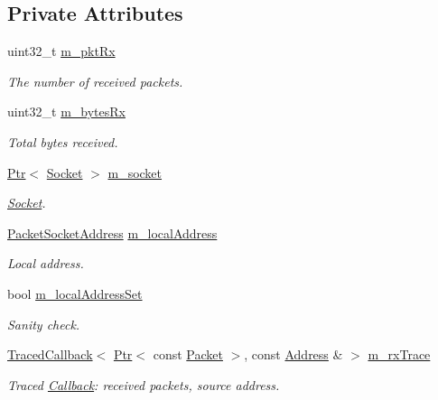 \subsection*{Private Attributes}
\begin{DoxyCompactItemize}
\item 
uint32\+\_\+t \hyperlink{classns3_1_1PacketSocketServer_a48eb8835ae187f34b25dc02e442e1991}{m\+\_\+pkt\+Rx}
\begin{DoxyCompactList}\small\item\em The number of received packets. \end{DoxyCompactList}\item 
uint32\+\_\+t \hyperlink{classns3_1_1PacketSocketServer_a007a317437b5be01ee349ec3c3333425}{m\+\_\+bytes\+Rx}
\begin{DoxyCompactList}\small\item\em Total bytes received. \end{DoxyCompactList}\item 
\hyperlink{classns3_1_1Ptr}{Ptr}$<$ \hyperlink{classns3_1_1Socket}{Socket} $>$ \hyperlink{classns3_1_1PacketSocketServer_a3a15d1cb5dfa1472a94ab958427c3f3e}{m\+\_\+socket}
\begin{DoxyCompactList}\small\item\em \hyperlink{classns3_1_1Socket}{Socket}. \end{DoxyCompactList}\item 
\hyperlink{classns3_1_1PacketSocketAddress}{Packet\+Socket\+Address} \hyperlink{classns3_1_1PacketSocketServer_abf4811c14be356e6f72b533c808cab97}{m\+\_\+local\+Address}
\begin{DoxyCompactList}\small\item\em Local address. \end{DoxyCompactList}\item 
bool \hyperlink{classns3_1_1PacketSocketServer_a3d7f93509397b5017f88b306f0cb0b81}{m\+\_\+local\+Address\+Set}
\begin{DoxyCompactList}\small\item\em Sanity check. \end{DoxyCompactList}\item 
\hyperlink{classns3_1_1TracedCallback}{Traced\+Callback}$<$ \hyperlink{classns3_1_1Ptr}{Ptr}$<$ const \hyperlink{classns3_1_1Packet}{Packet} $>$, const \hyperlink{classns3_1_1Address}{Address} \& $>$ \hyperlink{classns3_1_1PacketSocketServer_afb9c702ee314f845b2becc20bf779c09}{m\+\_\+rx\+Trace}
\begin{DoxyCompactList}\small\item\em Traced \hyperlink{classns3_1_1Callback}{Callback}\+: received packets, source address. \end{DoxyCompactList}\end{DoxyCompactItemize}
